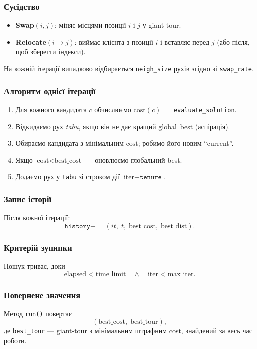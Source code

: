 \documentclass[12pt,a4paper]{article}
\begin{document}
\subsubsection{Сусідство}
\begin{itemize}
  \item \textbf{Swap}\((i,j)\): міняє місцями позиції \(i\) і \(j\) у giant-tour.
  \item \textbf{Relocate}\((i\!\to\!j)\): виймає клієнта з позиції \(i\)
        і вставляє перед \(j\) (або після, щоб зберегти індекси).
\end{itemize}
На кожній ітерації випадково відбирається
\texttt{neigh\_size} рухів згідно зі \texttt{swap\_rate}.

\subsubsection{Алгоритм однієї ітерації}
\begin{enumerate}
  \item Для кожного кандидата \(c\) обчислюємо  
        \(\text{cost}(c)=\)~\texttt{evaluate\_solution}.
  \item Відкидаємо рух \emph{tabu}, якщо він не дає кращий
        global~best (аспірація).
  \item Обираємо кандидата з мінімальним \(\text{cost}\);
        робимо його новим ``current''.
  \item Якщо \(\text{cost}<\text{best\_cost}\) —
        оновлюємо глобальний best.
  \item Додаємо рух у \texttt{tabu} зі строком
        дії \(\text{iter}+\texttt{tenure}\).
\end{enumerate}

\subsubsection{Запис історії}
Після кожної ітерації:
\[
\texttt{history}\mathrel{+\!=}
(it,\;t,\;\text{best\_cost},\;\text{best\_dist}).
\]

\subsubsection{Критерій зупинки}
Пошук триває, доки
\[
\text{elapsed}<\text{time\_limit}
\quad\land\quad
\text{iter}<\text{max\_iter}.
\]

\subsubsection{Повернене значення}
Метод \texttt{run()} повертає
\[
(\text{best\_cost},\;\text{best\_tour}),
\]
де \texttt{best\_tour} — giant-tour з мінімальним штрафним cost,
знайдений за весь час роботи.
\end{document}
